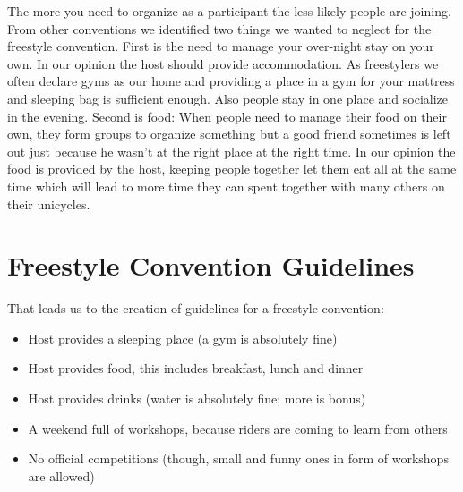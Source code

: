 \documentclass[11pt]{report}
\begin{document}
The more you need to organize as a participant the less likely people are 
joining. From other conventions we identified two things we wanted to neglect 
for the freestyle convention.
First is the need to manage your over-night stay on your own. In our opinion the 
host should provide accommodation. As freestylers we often declare gyms as our 
home and providing a place in a gym for your mattress and sleeping bag is 
sufficient enough. Also people stay in one place and socialize in the evening.
Second is food: When people need to manage their food on their own, they form 
groups to organize something but a good friend sometimes is left out just because 
he wasn't at the right place at the right time. In our opinion the food is 
provided by the host, keeping people together let them eat all at the same time 
which will lead to more time they can spent together with many others on their 
unicycles.

\section{Freestyle Convention Guidelines}

That leads us to the creation of guidelines for a freestyle convention:

\begin{itemize}
	\item Host provides a sleeping place (a gym is absolutely fine)
	\item Host provides food, this includes breakfast, lunch and dinner
	\item Host provides drinks (water is absolutely fine; more is bonus)
	\item A weekend full of workshops, because riders are coming to learn from 
	others
	\item No official competitions (though, small and funny ones in form of 
	workshops are allowed)
\end{itemize}
\end{document}

